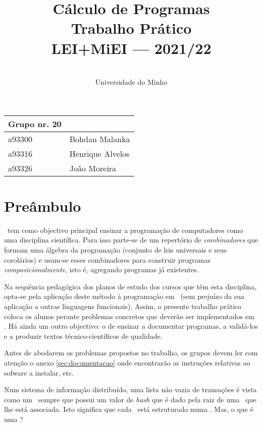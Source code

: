 \documentclass[a4paper]{article}
\title{
          Cálculo de Programas
\\
          Trabalho Prático
\\
          LEI+MiEI --- 2021/22
}
\author{
          \dium
\\
          Universidade do Minho
}
\date\mydate
\begin{document}
\maketitle

\begin{center}\large
\begin{tabular}{ll}
\textbf{Grupo} nr. 20
\\\hline
a93300 & Bohdan Malanka
\\
a93316 & Henrique Alvelos
\\
a93326 & João Moreira
\end{tabular}
\end{center}

\section{Preâmbulo}

\CP\ tem como objectivo principal ensinar
a progra\-mação de computadores como uma disciplina científica. Para isso
parte-se de um repertório de \emph{combinadores} que formam uma álgebra da
programação (conjunto de leis universais e seus corolários) e usam-se esses
combinadores para construir programas \emph{composicionalmente}, isto é,
agregando programas já existentes.

Na sequência pedagógica dos planos de estudo dos cursos que têm
esta disciplina, opta-se pela aplicação deste método à programação
em \Haskell\ (sem prejuízo da sua aplicação a outras linguagens
funcionais). Assim, o presente trabalho prático coloca os
alunos perante problemas concretos que deverão ser implementados em
\Haskell.  Há ainda um outro objectivo: o de ensinar a documentar
programas, a validá-los e a produzir textos técnico-científicos de
qualidade.

Antes de abodarem os problemas propostos no trabalho, os grupos devem ler
com atenção o anexo \ref{sec:documentacao} onde encontrarão as instruções
relativas ao sofware a instalar, etc.


\Problema

Num sistema de informação distribuído, uma lista não vazia de transações
é vista como um \textit\blockchain\ sempre que possui um valor de \textit{hash}
que é dado pela raiz de uma \MerkleTree\ que lhe está associada. Isto significa
que cada \textit\blockchain\ está estruturado numa \MerkleTree.
Mas, o que é uma \MerkleTree?
\end{document}
